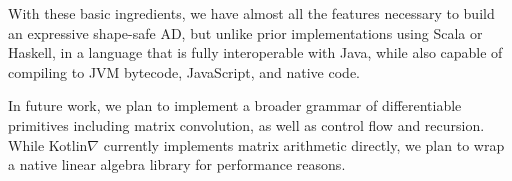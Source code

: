 \documentclass{article}
\begin{document}
With these basic ingredients, we have almost all the features necessary to build an expressive shape-safe AD, but unlike prior implementations using Scala or Haskell, in a language that is fully interoperable with Java, while also capable of compiling to JVM bytecode, JavaScript, and native code.

In future work, we plan to implement a broader grammar of differentiable primitives including matrix convolution, as well as control flow and recursion. While Kotlin$\nabla$ currently implements matrix arithmetic directly, we plan to wrap a native linear algebra library for performance reasons.

\squeezeup

\end{document}
